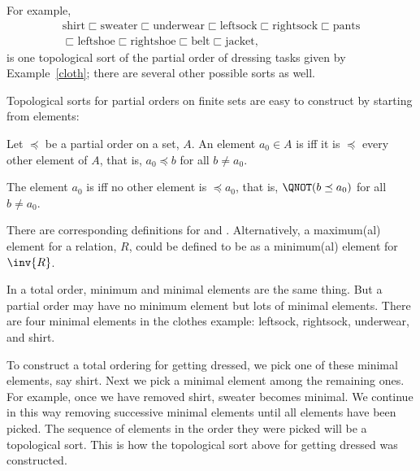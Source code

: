 For example,
\begin{align*}
  \text{shirt} \sqsubset \text{sweater} \sqsubset \text{underwear}
  \sqsubset \text{leftsock}
  \sqsubset \text{rightsock} \sqsubset \text{pants}\\
  \sqsubset \text{leftshoe} \sqsubset \text{rightshoe} \sqsubset
  \text{belt} \sqsubset \text{jacket},
\end{align*}
is one topological sort of the partial order of dressing tasks given by
Example~\ref{cloth}; there are several other possible sorts as well.

Topological sorts for partial orders on finite sets are easy to construct
by starting from  elements:

\begin{definition}
  Let $\preceq$ be a partial order on a set, $A$.  An element $a_0 \in A$
  is  iff it is $\preceq$ every
  other element of $A$, that is, $a_0 \preceq b$ for all $b \neq a_0$.

  The element $a_0$ is  iff no
  other element is $\preceq a_0$, that is, $\QNOT(b \preceq a_0)$ for all
  $b \neq a_0$.
\end{definition}
There are corresponding definitions for  and .
Alternatively, a maximum(al) element for a relation, $R$, could be
defined to be as a minimum(al) element for $\inv{R}$.

In a total order, minimum and minimal elements are the same thing.  But a
partial order may have no minimum element but lots of minimal elements.
There are four minimal elements in the clothes example: leftsock,
rightsock, underwear, and shirt.

To construct a total ordering for getting dressed, we pick one of these
minimal elements, say shirt.  Next we pick a minimal element among the
remaining ones.  For example, once we have removed shirt, sweater becomes
minimal.  We continue in this way removing successive minimal elements
until all elements have been picked.  The sequence of elements in the
order they were picked will be a topological sort.  This is how the
topological sort above for getting dressed was constructed.


